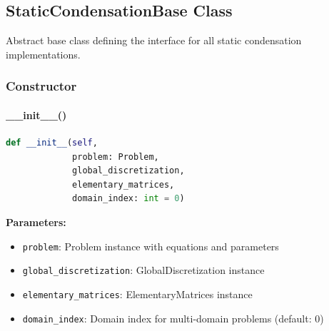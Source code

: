 %
%
%

\subsection{StaticCondensationBase Class}
\label{subsec:static_condensation_base}

Abstract base class defining the interface for all static condensation implementations.

\subsubsection{Constructor}

\paragraph{\_\_init\_\_()}\leavevmode
\begin{lstlisting}[language=Python, caption=StaticCondensationBase Constructor]
def __init__(self, 
             problem: Problem, 
             global_discretization, 
             elementary_matrices, 
             domain_index: int = 0)
\end{lstlisting}

\textbf{Parameters:}
\begin{itemize}
    \item \texttt{problem}: Problem instance with equations and parameters
    \item \texttt{global\_discretization}: GlobalDiscretization instance
    \item \texttt{elementary\_matrices}: ElementaryMatrices instance
    \item \texttt{domain\_index}: Domain index for multi-domain problems (default: 0)
\end{itemize}

